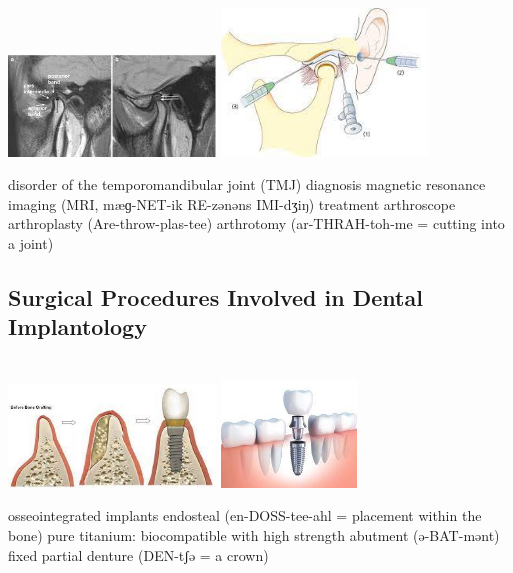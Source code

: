 \documentclass[
paper=landscape,
paper=160mm:90mm, %
fontsize=11pt, %
pagesize, %
parskip=half-, %
]{scrartcl} %
\newenvironment{WrapText1}[3][r]
{\wrapfigure[#2]{#1}{#3}}
{\endwrapfigure}
\newcommand{\wrapr}[6]{
\begin{minipage}{\linewidth}\mbox{}\\
\vspace{#1}
\begin{WrapText1}{#2}{#3}
\vspace{#4}#5\end{WrapText1}#6
\end{minipage}}
\theoremstyle{mythmstyle} %
\begin{document}
\wrapr{-8mm}{7}{6cm}{-1mm}
{%
\includegraphics[width=5.5cm]{MRI.png}
\includegraphics[width=5.5cm]{arthroscope.png}
} %
{%
\begin{outline}
\0 disorder of the temporomandibular joint (TMJ)
\1 diagnosis
\2 magnetic resonance imaging (MRI, mæɡ-NET-ik RE-zənəns IMI-dʒiŋ)
\1 treatment
    \2 arthroscope
    \2 arthroplasty (Are-throw-plas-tee)
    \2 arthrotomy (ar-THRAH-toh-me = cutting into a joint)
\end{outline}
} %

\clearpage
\subsection{Surgical Procedures Involved in Dental Implantology}

\wrapr{-8mm}{7}{6cm}{-1mm}
{%
\includegraphics[width=5.5cm]{ridge_augmentation.png}
\includegraphics[width=3.6cm]{dental_implant.png}
} %
{%
\begin{outline}

\1 osseointegrated implants
    \2 endosteal (en-DOSS-tee-ahl = placement within the bone)
    \2 pure titanium: biocompatible with high strength
    \2 abutment (ə-BAT-mənt)
    \2 fixed partial denture (DEN-tʃə = a crown)
\end{outline}
} %
\end{document}
